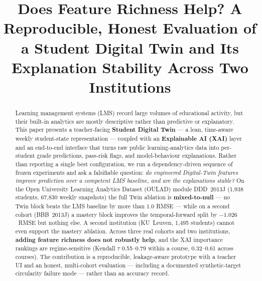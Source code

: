 \documentclass[conference]{IEEEtran}
\begin{document}
\title{Does Feature Richness Help? A Reproducible, Honest Evaluation of a
Student Digital Twin and Its Explanation Stability Across Two Institutions}

\author{
\and
{}
\and
{}
}

\maketitle

\begin{abstract}
Learning management systems (LMS) record large volumes of educational activity,
but their built-in analytics are mostly descriptive rather than predictive or
explanatory. This paper presents a teacher-facing \textbf{Student Digital Twin}
--- a lean, time-aware weekly student-state representation --- coupled with an
\textbf{Explainable AI (XAI)} layer and an end-to-end interface that turns raw
public learning-analytics data into per-student grade predictions, pass-risk
flags, and model-behaviour explanations. Rather than reporting a single best
configuration, we run a dependency-driven sequence of frozen experiments and ask
a falsifiable question: \emph{do engineered Digital-Twin features improve
prediction over a competent LMS baseline, and are the explanations stable?} On
the Open University Learning Analytics Dataset (OULAD) module DDD~2013J
(1{,}938 students, 67{,}830 weekly snapshots) the full Twin ablation is
\textbf{mixed-to-null} --- no Twin block beats the LMS baseline by more than
$1.0$ RMSE --- while on a second cohort (BBB~2013J) a mastery block improves the
temporal-forward split by $-1.026$~RMSE but nothing else. A second institution
(KU~Leuven, 1{,}495 students) cannot even support the mastery ablation. Across
three real cohorts and two institutions, \textbf{adding feature richness does not
robustly help}, and the XAI importance rankings are regime-sensitive (Kendall
$\tau$ 0.55--0.79 within a course, 0.32--0.61 across courses). The contribution
is a reproducible, leakage-aware prototype with a teacher UI and an honest,
multi-cohort evaluation --- including a documented synthetic-target circularity
failure mode --- rather than an accuracy record.
\end{abstract}
\end{document}
